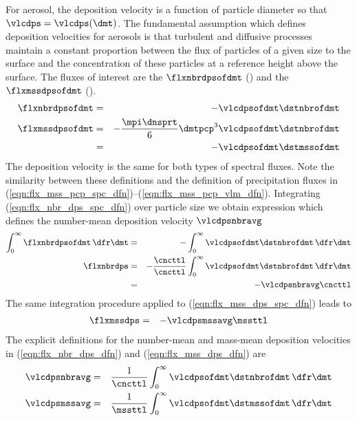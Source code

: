 \documentclass[12pt,twoside]{book}
\begin{document}
For aerosol, the deposition velocity is a function of particle
diameter so that $\vlcdps = \vlcdps(\dmt)$.
The fundamental assumption which defines deposition velocities 
for aerosols is that turbulent and diffusive processes maintain
a constant proportion between the flux of particles of a
given size to the surface and the concentration of these particles at 
a reference height above the surface.
The fluxes of interest are the  $\flxnbrdpsofdmt$ (\nbrxmSsm) and the  $\flxmssdpsofdmt$ (\kgxmSsm).
\begin{eqnarray}
\label{eqn:flx_nbr_dps_spc_dfn}
\flxnbrdpsofdmt & = & - \vlcdpsofdmt \dstnbrofdmt \\
\flxmssdpsofdmt & = & - \frac{\mpi \dnsprt}{6} \dmtpcp^{3} \vlcdpsofdmt \dstnbrofdmt
\nonumber \\
\label{eqn:flx_mss_dps_spc_dfn}
& = & - \vlcdpsofdmt \dstmssofdmt
\end{eqnarray}
The deposition velocity is the same for both types of spectral fluxes.
Note the similarity between these definitions and the definition of
precipitation fluxes in
(\ref{eqn:flx_mss_pcp_spc_dfn})--(\ref{eqn:flx_mss_pcp_vlm_dfn}).
Integrating (\ref{eqn:flx_nbr_dps_spc_dfn}) over particle size 
we obtain expression which defines the number-mean deposition
velocity $\vlcdpsnbravg$
\begin{eqnarray}
\int_{0}^{\infty} \flxnbrdpsofdmt \,\dfr\dmt & = & 
- \int_{0}^{\infty} \vlcdpsofdmt \dstnbrofdmt \,\dfr\dmt \nonumber \\
\flxnbrdps & = & 
- \frac{\cncttl}{\cncttl }
\int_{0}^{\infty} \vlcdpsofdmt \dstnbrofdmt \,\dfr\dmt \nonumber \\
& = & - \vlcdpsnbravg \cncttl
\label{eqn:flx_nbr_dps_dfn}
\end{eqnarray}
The same integration procedure applied to
(\ref{eqn:flx_mss_dps_spc_dfn}) leads to 
\begin{eqnarray}
\flxmssdps & = & - \vlcdpsmssavg \mssttl
\label{eqn:flx_mss_dps_dfn}
\end{eqnarray}
The explicit definitions for the number-mean and mass-mean deposition
velocities in (\ref{eqn:flx_nbr_dps_dfn}) and
(\ref{eqn:flx_mss_dps_dfn}) are
\begin{eqnarray}
\label{eqn:vlc_dps_nbr_dfn}
\vlcdpsnbravg & = & \frac{1}{\cncttl}
\int_{0}^{\infty} \vlcdpsofdmt \dstnbrofdmt \,\dfr\dmt \\
\label{eqn:vlc_dps_mss_dfn}
\vlcdpsmssavg & = & \frac{1}{\mssttl}
\int_{0}^{\infty} \vlcdpsofdmt \dstmssofdmt \,\dfr\dmt
\end{eqnarray}
\end{document}
